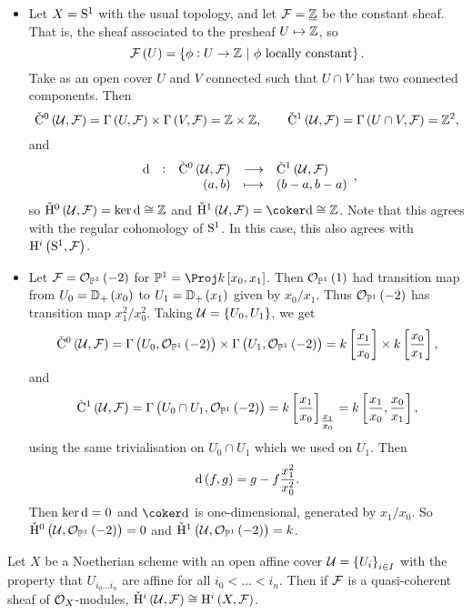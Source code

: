 \begin{example*}
\hfill
\begin{itemize}
\item Let $ X = \S^1 $ with the usual topology, and let $ \FFF = \underline{\ZZ} $ be the constant sheaf. That is, the sheaf associated to the presheaf $ U \mapsto \ZZ $, so
$$ \FFF\br{U} = \cbr{\phi : U \to \ZZ \st \phi \ \text{locally constant}}. $$
Take as an open cover $ U $ and $ V $ connected such that $ U \cap V $ has two connected components. Then
$$ \vC^0\br{\UUU, \FFF} = \Gamma\br{U, \FFF} \times \Gamma\br{V, \FFF} = \ZZ \times \ZZ, \qquad \vC^1\br{\UUU, \FFF} = \Gamma\br{U \cap V, \FFF} = \ZZ^2, $$
and
$$ \function[\d]{\vC^0\br{\UUU, \FFF}}{\vC^1\br{\UUU, \FFF}}{\br{a, b}}{\br{b - a, b - a}}, $$
so $ \vH^0\br{\UUU, \FFF} = \ker \d \cong \ZZ $ and $ \vH^1\br{\UUU, \FFF} = \coker \d \cong \ZZ $. Note that this agrees with the regular cohomology of $ \S^1 $. In this case, this also agrees with $ \H^i\br{\S^1, \FFF} $.
\item Let $ \FFF = \OOO_{\PP^1}\br{-2} $ for $ \PP^1 = \Proj k\sbr{x_0, x_1} $. Then $ \OOO_{\PP^1}\br{1} $ had transition map from $ U_0 = \DD_+\br{x_0} $ to $ U_1 = \DD_+\br{x_1} $ given by $ x_0 / x_1 $. Thus $ \OOO_{\PP^1}\br{-2} $ has transition map $ x_1^2 / x_0^2 $. Taking $ \UUU = \cbr{U_0, U_1} $, we get
$$ \vC^0\br{\UUU, \FFF} = \Gamma\br{U_0, \OOO_{\PP^1}\br{-2}} \times \Gamma\br{U_1, \OOO_{\PP^1}\br{-2}} = k\sbr{\dfrac{x_1}{x_0}} \times k\sbr{\dfrac{x_0}{x_1}}, $$
and
$$ \vC^1\br{\UUU, \FFF} = \Gamma\br{U_0 \cap U_1, \OOO_{\PP^1}\br{-2}} = k\sbr{\dfrac{x_1}{x_0}}_{\tfrac{x_1}{x_0}} = k\sbr{\dfrac{x_1}{x_0}, \dfrac{x_0}{x_1}}, $$
using the same trivialisation on $ U_0 \cap U_1 $ which we used on $ U_1 $. Then
$$ \d\br{f, g} = g - f\dfrac{x_1^2}{x_0^2}. $$
Then $ \ker \d = 0 $ and $ \coker \d $ is one-dimensional, generated by $ x_1 / x_0 $. So $ \vH^0\br{\UUU, \OOO_{\PP^1}\br{-2}} = 0 $ and $ \vH^1\br{\UUU, \OOO_{\PP^1}\br{-2}} = k $.
\end{itemize}
\end{example*}

\begin{theorem}
Let $ X $ be a Noetherian scheme with an open affine cover $ \UUU = \cbr{U_i}_{i \in I} $ with the property that $ U_{i_0 \dots i_n} $ are affine for all $ i_0 < \dots < i_n $. Then if $ \FFF $ is a quasi-coherent sheaf of $ \OOO_X $-modules, $ \vH^i\br{\UUU, \FFF} \cong \H^i\br{X, \FFF} $.
\end{theorem}


